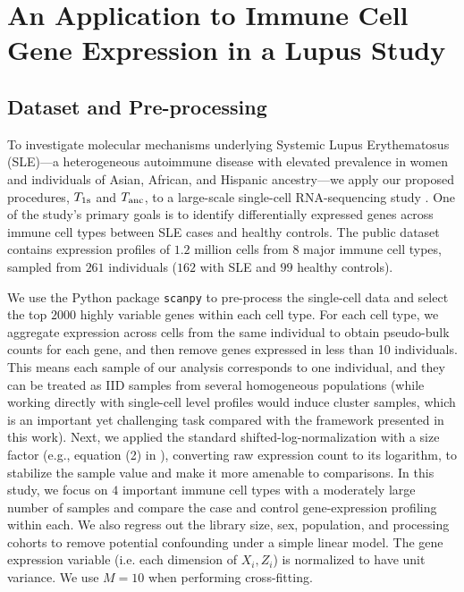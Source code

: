 \documentclass[11pt]{article}
\newenvironment{revblock}
  {\color{teal}}
  {}
\begin{document}
\section{An Application to Immune Cell Gene Expression in a Lupus Study}\label{section: real data}

\subsection{Dataset and Pre-processing}

To investigate molecular mechanisms underlying Systemic Lupus Erythematosus (SLE)—a heterogeneous autoimmune disease with elevated prevalence in women and individuals of Asian, African, and Hispanic ancestry—we apply our proposed procedures, $T_{\rm 1s}$ and $T_{\rm anc}$, to a large-scale single-cell RNA-sequencing study \cite{perez2022single}. One of the study’s primary goals is to identify differentially expressed genes across immune cell types between SLE cases and healthy controls. The public dataset contains expression profiles of $1.2$ million cells from 8 major immune cell types, sampled from $261$ individuals ($162$ with SLE and $99$ healthy controls).

\begin{revblock}
We use the Python package {\tt scanpy} \cite{wolf2018scanpy} to pre-process the single-cell data and select the top $2000$ highly variable genes within each cell type.  For each cell type, we aggregate expression across cells from the same individual to obtain pseudo-bulk counts for each gene, and then remove genes expressed in less than 10 individuals. 
This means each sample of our analysis corresponds to one individual, and they can be treated as IID samples from several homogeneous populations (while working directly with single-cell level profiles would induce cluster samples, which is an important yet challenging task compared with the framework presented in this work). 
\end{revblock}
Next, we applied the standard shifted-log-normalization with a size factor (e.g., equation (2) in \cite{ahlmann2023comparison}), converting raw expression count to its logarithm, to stabilize the sample value and make it more amenable to comparisons. In this study, we focus on $4$ important immune cell types with a moderately large number of samples and compare the case and control gene-expression profiling within each. We also regress out the library size, sex, population, and processing cohorts to remove potential confounding under a simple linear model. The gene expression variable (i.e. each dimension of $X_i, Z_i$) is normalized to have unit variance. We use $M=10$ when performing cross-fitting.
\end{document}
